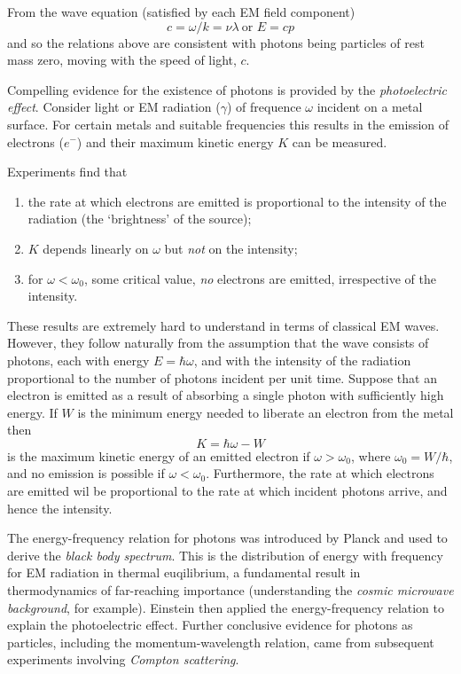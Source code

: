 \documentclass[a4paper]{article}
\begin{document}
From the wave equation (satisfied by each EM field component)
\[
  c= \omega/k = \nu\lambda \: \text{or } E=cp
\]
and so the relations above are consistent with photons being particles of rest mass zero, moving with the speed of light, $c$.

Compelling evidence for the existence of photons is provided by the \emph{photoelectric effect}. Consider light or EM radiation ($\gamma$) of frequence $\omega$ incident on a metal surface. For certain metals and suitable frequencies this results in the emission of electrons ($e^-$) and their maximum kinetic energy $K$ can be measured.

Experiments find that
\begin{enumerate}
\item the rate at which electrons are emitted is proportional to the intensity of the radiation (the `brightness' of the source);
\item $K$ depends linearly on $\omega$ but \emph{not} on the intensity;
  \item for $\omega < \omega_0$, some critical value, \emph{no} electrons are emitted, irrespective of the intensity.
\end{enumerate}

These results are extremely hard to understand in terms of classical EM waves. However, they follow naturally from the assumption that the wave consists of photons, each with energy $E=\hbar\omega$, and with the intensity of the radiation proportional to the number of photons incident per unit time. Suppose that an electron is emitted as a result of absorbing a single photon with sufficiently high energy. If $W$ is the minimum energy needed to liberate an electron from the metal then
\[
  K=\hbar\omega-W
\]
is the maximum kinetic energy of an emitted electron if $\omega>\omega_0$, where $\omega_0=W/\hbar$, and no emission is possible if $\omega<\omega_0$. Furthermore, the rate at which electrons are emitted wil be proportional to the rate at which incident photons arrive, and hence the intensity.

The energy-frequency relation for photons was introduced by Planck and used to derive the \emph{black body spectrum}. This is the distribution of energy with frequency for EM radiation in thermal euqilibrium, a fundamental result in thermodynamics of far-reaching importance (understanding the \emph{cosmic microwave background}, for example). Einstein then applied the energy-frequency relation to explain the photoelectric effect. Further conclusive evidence for photons as particles, including the momentum-wavelength relation, came from subsequent experiments involving \emph{Compton scattering}.
\end{document}
